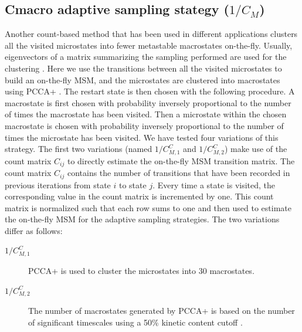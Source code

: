 \subsection{Cmacro adaptive sampling stategy ($1/C_M$)} 
Another count-based method that has been used in different applications clusters all the
visited microstates into fewer metastable macrostates on-the-fly. Usually, eigenvectors of
a matrix summarizing the sampling performed are used for the clustering
\cite{preto2014fast, doerr2016htmd}.  Here we use the transitions between all
the visited microstates to build an on-the-fly MSM, and the microstates are
clustered into macrostates using PCCA+ \cite{roblitz2013fuzzy}. 
The restart state is then chosen with the following procedure. A macrostate
is first chosen with probability inversely proportional to the number of times
the macrostate has been visited. Then a microstate within the chosen macrostate
is chosen with probability inversely proportional to the number of times the
microstate has been visited. We have tested four variations of this strategy.
The first two variations (named $1/C_{M,1}^C$ and $1/C_{M,2}^C$) make use of the count
matrix $C_{ij}$ to directly estimate the on-the-fly MSM transition matrix. The count matrix
$C_{ij}$ contains the number of transitions that have been recorded in previous
iterations from state $i$ to state $j$. Every time a state is visited, the corresponding value
in the count matrix is incremented by one. This count matrix is normalized such
that each row sums to one and then used to estimate the on-the-fly MSM for the
adaptive sampling strategies.
The two variations differ as follows:
\begin{description}
\item[$1/C_{M,1}^C$]
PCCA+ is used to cluster the microstates into 30 macrostates.
\item[$1/C_{M,2}^C$]
The number of macrostates generated by PCCA+ is based on the number of
significant timescales using a 50\% kinetic content cutoff \cite{noe2016commute}.
\end{description}

